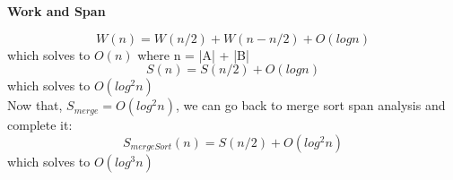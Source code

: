 \documentclass[12pt]{article}
\begin{document}
\textbf{Work and Span}

$$W(n) = W(n/2) + W(n-n/2) + O(log{n})$$
which solves to $O(n)$ where n = |A| + |B|\\

$$S(n) = S(n/2) + O(log{n})$$
which solves to $O(log^2n)$\\

Now that, $S_{merge} = O(log^2n)$,
we can go back to merge sort span analysis and complete it:
$$S_{mergeSort}(n) = S(n/2) + O(log^2n)$$
which solves to $O(log^3n)$
\end{document}
